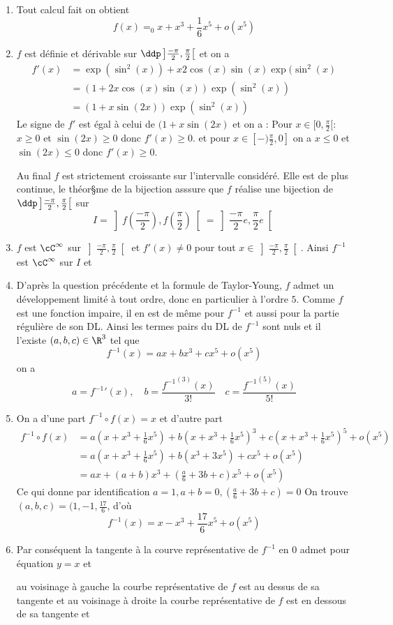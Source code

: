 \begin{correction}
\begin{enumerate}
\item Tout calcul fait on obtient 
$$f(x) =_0 x +x^3+\frac{1}{6}x^5 +o(x^5)$$
\item $f$ est définie et dérivable sur $\ddp \left] \frac{-\pi}{2},\frac{\pi}{2}\right[$ et on a 
\begin{align*}
f'(x) &= \exp(\sin^2(x)) +x 2\cos(x)\sin(x) \exp(\sin^2(x)\\
&= (1+ 2x\cos(x)\sin(x))\exp(\sin^2(x)) \\
&=(1+x\sin(2x))\exp(\sin^2(x)) 
\end{align*}
Le signe de $f'$ est égal à celui de $(1+x\sin(2x)$ et on a :
Pour $x \in [0,\frac{\pi}{2}[ :$ $x\geq 0 $ et $\sin(2x) \geq 0$ donc 
$f'(x) \geq 0$. 
et pour $x\in [-)\frac{\pi}{2} , 0]$ on a $x\leq 0$ et $\sin(2x) \leq 0$ donc $f'(x)\geq 0$.  

Au final $f$ est strictement croissante sur l'intervalle considéré. Elle est de plus  continue, le théor§me de la bijection asssure que $f$ réalise une bijection de $\ddp \left] \frac{-\pi}{2},\frac{\pi}{2}\right[$ sur $$I =\left] f(\frac{-\pi}{2}),f(\frac{\pi}{2})\right[ = \left] \frac{-\pi}{2}e,\frac{\pi}{2}e\right[$$

\item $f$ est $\cC^{\infty} $ sur  $\left] \frac{-\pi}{2},\frac{\pi}{2}\right[$ et $f'(x) \neq 0$ pour tout $x\in \left] \frac{-\pi}{2},\frac{\pi}{2}\right[$. Ainsi $f^{-1}$ est $\cC^{\infty}$ sur $I$ et 
\item D'après la question précédente et la formule de Taylor-Young, $f$ admet un développement limité à tout ordre, donc en particulier à l'ordre $5$. 
Comme $f$ est une fonction impaire, il en est de même pour $f^{-1}$ et aussi pour la partie régulière de son DL.  Ainsi les termes pairs du DL de $f^{-1}$ sont nuls et il l'existe $(a,b,c)\in \R^3$ tel que 
$$f^{-1} (x) = ax+bx^3+cx^5+o(x^5)$$
on a 
$$a={f^{-1}}'(x), \quad b = \frac{{f^{-1}}^{(3)}(x)}{3!} \quad  c = \frac{{f^{-1}}^{(5)}(x)}{5!}$$

\item On a d'une part $f^{-1}\circ f (x) = x$ et d'autre part 
\begin{align*}
f^{-1}\circ f (x) &= a (x +x^3+\frac{1}{6}x^5) +b (x +x^3+\frac{1}{6}x^5)^3 +c (x +x^3+\frac{1}{6}x^5)^5 +o(x^5)\\
&=  a (x +x^3+\frac{1}{6}x^5) +b (x^3 +3x^5) +c x^5 +o(x^5)\\
&=  a x +(a+b)x^3+(\frac{a}{6}+3b+c)x^5  +o(x^5)
\end{align*}
Ce qui donne par identification 
$a=1, a+b=0 , (\frac{a}{6}+3b+c)=0$
On trouve  $(a,b,c)= (1,-1 , \frac{17}{6}$, d'où 
$$f^{-1} (x) = x-x^3 + \frac{17}{6} x^5 +o(x^5)$$
\item Par conséquent la tangente à la courve représentative de $f^{-1} $ en $0$ admet pour équation $y=x$ et 

au voisinage à gauche la courbe représentative de $f$ est au dessus de sa tangente et au voisinage à droite la courbe représentative de $f$ est en dessous de sa tangente et 
\end{enumerate}

\end{correction}